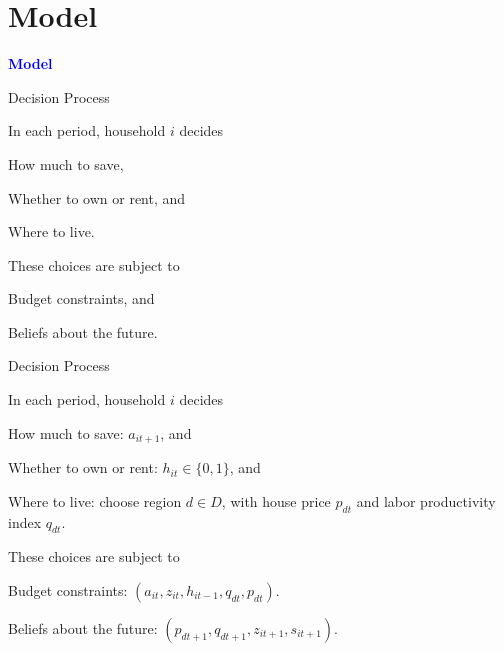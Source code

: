 \documentclass[12pt,english, aspectratio=169]{beamer}
\begin{document}
\section{Model}
\begin{frame}[plain]{}

\vspace{1cm}

\begin{center}
\textbf{\textcolor{blue}{\LARGE{}Model}}{\LARGE\par}
\par\end{center}

\end{frame}
\begin{frame}{Decision Process}

In each period, household $i$ decides 
\begin{midi}
\item How much to save,
\item Whether to own or rent, and
\item Where to live.
\end{midi}
\vspace{0.5cm}
These choices are subject to
\begin{midi}
\item Budget constraints, and
\item Beliefs about the future.
\end{midi}
\end{frame}

\begin{frame}{Decision Process}

In each period, household $i$ decides 
\begin{midi}
\item How much to save: $a_{it+1}$, and
\item Whether to own or rent: $h_{it}\in\{0,1\}$, and
\item Where to live: choose region $d\in D$, with house price $p_{dt}$
and labor productivity index $q_{dt}$.
\end{midi}
\vspace{0.5cm}
These choices are subject to
\begin{midi}
\item Budget constraints: $\left(a_{it},z_{it},h_{it-1},q_{dt},p_{dt}\right)$.
\item Beliefs about the future: $\left(p_{dt+1},q_{dt+1},z_{it+1},s_{it+1}\right)$.
\end{midi}
\end{frame}
\end{document}
